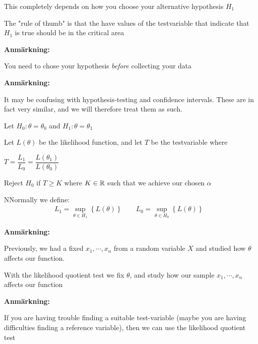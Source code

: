 \par\bigskip
\begin{lem}{}
  This completely depends on how you choose your alternative hypothesis $H_1$\par
  \noindent The "rule of thumb" is that the have values of the testvariable that indicate that $H_1$ is true should be in the critical area
\end{lem}
\par\bigskip
\noindent\textbf{Anmärkning:}\par
\noindent You need to chose your hypothesis \textit{before} collecting your data
\par\bigskip
\noindent\textbf{Anmärkning:}\par
\noindent It may be confusing with hypothesis-testing and confidence intervals. These are in fact very similar, and we will therefore treat them as such. 
\newpage
\begin{theo}{}
  Let $H_0: \theta = \theta_0$ and $H_1: \theta = \theta_1$\par
  \noindent Let $L(\theta)$ be the likelihood function, and let $T$ be the testvariable where\par
  $T = \dfrac{L_1}{L_0} = \dfrac{L(\theta_1)}{L(\theta_0)}$
  \par\bigskip
  \noindent Reject $H_0$ if $T\geq K$ where $K\in\mathbb{R}$ such that we achieve our chosen $\alpha$ 
\end{theo}
\begin{lem}
  NNormally we define:
  \begin{equation*}
    \begin{gathered}
      L_1 = \sup_{\theta\in H_1}\left\{L(\theta)\right\}\qquad L_0=\sup_{\theta\in H_0}\left\{L(\theta)\right\}
    \end{gathered}
  \end{equation*}
\end{lem}
\par\bigskip
\noindent\textbf{Anmärkning:}\par
\noindent Previously, we had a fixed $x_1,\cdots,x_n$ from a random variable $X$ and studied how $\theta$ affects our function.\par
\noindent With the likelihood quotient test we fix $\theta$, and study how our sample $x_1,\cdots,x_n$ affects our function
\par\bigskip
\noindent\textbf{Anmärkning:}\par
\noindent If you are having trouble finding a suitable test-variable (maybe you are having difficulties finding a reference variable), then we can use the likelihood quotient test
\par\bigskip
